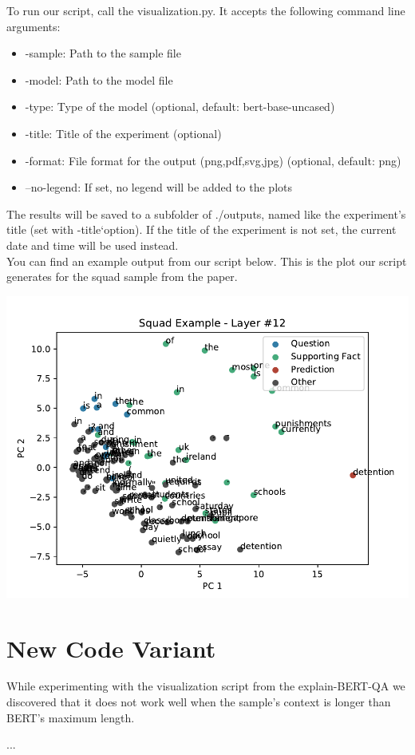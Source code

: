 \documentclass{article}
\begin{document}
	To run our script, call the visualization.py. It accepts the following command line arguments:
	
	\begin{itemize}
		\item -sample: Path to the sample file
		\item -model: Path to the model file
		\item -type: Type of the model (optional, default: bert-base-uncased)
		\item -title: Title of the experiment (optional)
		\item -format: File format for the output (png,pdf,svg,jpg) (optional, default: png)
		\item --no-legend: If set, no legend will be added to the plots
	\end{itemize}

	The results will be saved to a subfolder of ./outputs, named like the experiment's title (set with -title`option). If the title of the experiment is not set, the current date and time will be used instead.\\

	
	You can find an example output from our script below. This is the plot our script generates for the squad sample from the paper.
	
	\begin{center}
		\includegraphics{../badges/replicated/visualization/output/squad-example/layer-12.pdf}
	\end{center}
	
	\section{New Code Variant}
	While experimenting with the visualization script from the explain-BERT-QA we discovered that it does not work well when the sample's context is longer than BERT's maximum length.
	
	...
	
\end{document}

